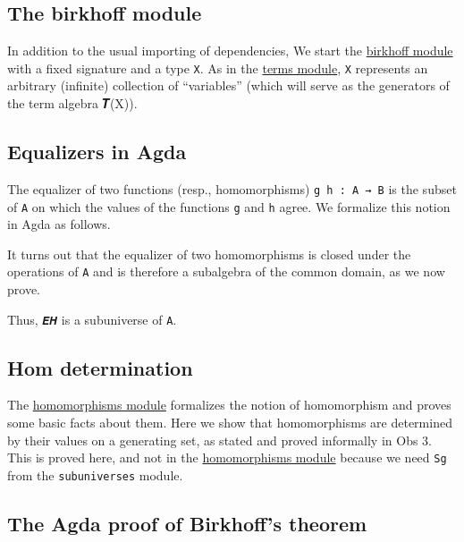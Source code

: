\documentclass[sigplan,screen]{acmart}
\newcommand\homomorphismsmodule{\href{https://gitlab.com/ualib/ualib.gitlab.io/-/blob/master/homomorphisms.lagda.rst}{homomorphisms module}\xspace}
\newcommand\termsmodule{\href{https://gitlab.com/ualib/ualib.gitlab.io/-/blob/master/terms.lagda.rst}{terms module}\xspace}
\newcommand\birkhoffmodule{\href{https://gitlab.com/ualib/ualib.gitlab.io/-/blob/master/birkhoff.lagda.rst}{birkhoff module}\xspace}
\begin{document}
\subsection{The birkhoff module}\label{the-birkhoff-module}
In addition to the usual importing of dependencies, We start the \birkhoffmodule with a fixed signature and a type \texttt{X}. As in the \termsmodule, \texttt{X} represents an arbitrary (infinite) collection of ``variables'' (which will serve as the generators of the term algebra 𝑻(X)).
\begin{code}\end{code}

\subsection{Equalizers in Agda}\label{equalizers-in-agda}
The equalizer of two functions (resp., homomorphisms) \texttt{g\ h\ :\ A\ →\ B} is the subset of \texttt{A} on which the values of the functions \texttt{g} and \texttt{h} agree. We formalize this notion in Agda as follows.
\begin{code}\end{code}
It turns out that the equalizer of two homomorphisms is closed under the operations of \texttt{A} and is therefore a subalgebra of the common domain, as we now prove.
\begin{code}\end{code}
Thus, \texttt{𝑬𝑯} is a subuniverse of \texttt{A}.

\subsection{Hom determination}\label{hom-determination}
The \homomorphismsmodule formalizes the notion of homomorphism and proves some basic facts about them. Here we show that homomorphisms are determined by their values on a generating set, as stated and proved informally in Obs 3. This is proved here, and not in the \homomorphismsmodule because we need \texttt{Sg} from the \texttt{subuniverses} module. %
\begin{code}\end{code}

\subsection{The Agda proof of Birkhoff's theorem}\label{the-agda-proof-of-birkhoffs-theorem}
\begin{code}\end{code}
\end{document}
